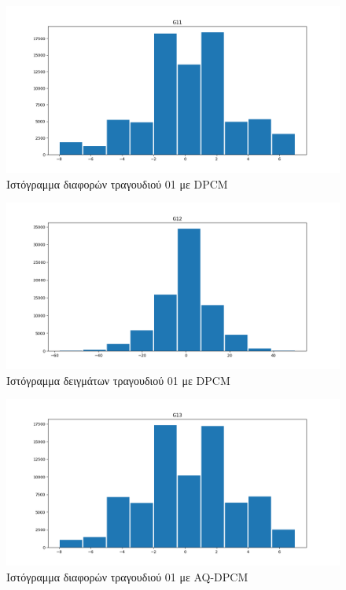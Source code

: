 \documentclass{article}
\begin{document}
\begin{figure}[H]
  \begin{center}
    \includegraphics[width=\textwidth]{G11.png}
  \end{center}
  \caption{Ιστόγραμμα διαφορών τραγουδιού 01 με DPCM}
\end{figure}

\begin{figure}[H]
  \begin{center}
    \includegraphics[width=\textwidth]{G12.png}
  \end{center}
  \caption{Ιστόγραμμα δειγμάτων τραγουδιού 01 με DPCM}
\end{figure}

\begin{figure}[H]
  \begin{center}
    \includegraphics[width=\textwidth]{G13.png}
  \end{center}
  \caption{Ιστόγραμμα διαφορών τραγουδιού 01 με AQ-DPCM}
\end{figure}
\end{document}
